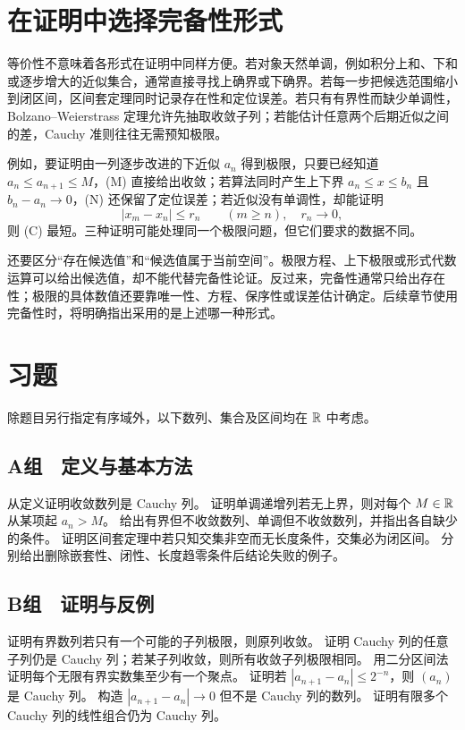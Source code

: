 \section{在证明中选择完备性形式}

等价性不意味着各形式在证明中同样方便。若对象天然单调，例如积分上和、下和或逐步增大的近似集合，通常直接寻找上确界或下确界。若每一步把候选范围缩小到闭区间，区间套定理同时记录存在性和定位误差。若只有有界性而缺少单调性，Bolzano--Weierstrass 定理允许先抽取收敛子列；若能估计任意两个后期近似之间的差，Cauchy 准则往往无需预知极限。

例如，要证明由一列逐步改进的下近似 \(a_n\) 得到极限，只要已经知道 \(a_n\le a_{n+1}\le M\)，(M) 直接给出收敛；若算法同时产生上下界 \(a_n\le x\le b_n\) 且 \(b_n-a_n\to0\)，(N) 还保留了定位误差；若近似没有单调性，却能证明
\[
 |x_m-x_n|\le r_n\qquad(m\ge n),
 \quad r_n\to0,
\]
则 (C) 最短。三种证明可能处理同一个极限问题，但它们要求的数据不同。

还要区分“存在候选值”和“候选值属于当前空间”。极限方程、上下极限或形式代数运算可以给出候选值，却不能代替完备性论证。反过来，完备性通常只给出存在性；极限的具体数值还要靠唯一性、方程、保序性或误差估计确定。后续章节使用完备性时，将明确指出采用的是上述哪一种形式。

\section*{习题}

除题目另行指定有序域外，以下数列、集合及区间均在 \(\mathbb{R}\) 中考虑。

\subsection*{A组　定义与基本方法}
\begin{enumerate}[label=\textbf{\thechapter.\arabic*.}]
  从定义证明收敛数列是 Cauchy 列。
  证明单调递增列若无上界，则对每个 \(M\in\mathbb{R}\) 从某项起 \(a_n>M\)。
  给出有界但不收敛数列、单调但不收敛数列，并指出各自缺少的条件。
  证明区间套定理中若只知交集非空而无长度条件，交集必为闭区间。
  分别给出删除嵌套性、闭性、长度趋零条件后结论失败的例子。
\end{enumerate}

\subsection*{B组　证明与反例}
\begin{enumerate}[label=\textbf{\thechapter.\arabic*.},resume]
  证明有界数列若只有一个可能的子列极限，则原列收敛。
  证明 Cauchy 列的任意子列仍是 Cauchy 列；若某子列收敛，则所有收敛子列极限相同。
  用二分区间法证明每个无限有界实数集至少有一个聚点。
  证明若 \(|a_{n+1}-a_n|\le2^{-n}\)，则 \((a_n)\) 是 Cauchy 列。
  构造 \(|a_{n+1}-a_n|\to0\) 但不是 Cauchy 列的数列。
  证明有限多个 Cauchy 列的线性组合仍为 Cauchy 列。
\end{enumerate}

